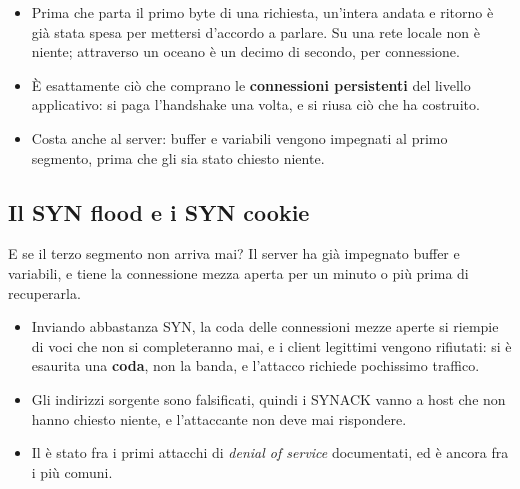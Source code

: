 \begin{itemize}
    \item Prima che parta il primo byte di una richiesta, un'intera andata e ritorno è già stata spesa per mettersi
          d'accordo a parlare. Su una rete locale non è niente; attraverso un oceano è un decimo di secondo, per
          connessione.
    \item È esattamente ciò che comprano le \textbf{connessioni persistenti} del livello applicativo: si paga l'handshake
          una volta, e si riusa ciò che ha costruito.
    \item Costa anche al server: buffer e variabili vengono impegnati al primo segmento, prima che gli sia stato chiesto
          niente.
\end{itemize}


\subsection{Il SYN flood e i SYN cookie}

E se il terzo segmento non arriva mai? Il server ha già impegnato buffer e variabili, e tiene la connessione mezza aperta
per un minuto o più prima di recuperarla.
\begin{itemize}
    \item Inviando abbastanza SYN, la coda delle connessioni mezze aperte si riempie di voci che non si completeranno mai, e
          i client legittimi vengono rifiutati: si è esaurita una \textbf{coda}, non la banda, e l'attacco richiede pochissimo
          traffico.
    \item Gli indirizzi sorgente sono falsificati, quindi i SYNACK vanno a host che non hanno chiesto niente, e
          l'attaccante non deve mai rispondere.
    \item Il  è stato fra i primi attacchi di \emph{denial of service} documentati, ed è ancora fra i più
          comuni.
\end{itemize}

